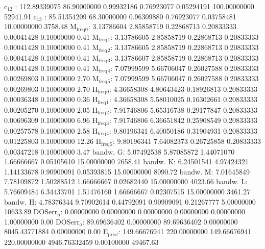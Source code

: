 \documentclass[11pt]{article}
\begin{document}
 c\(_{\text{12}}\)    : 112.89339075  86.90000000   0.99932186   0.76923077   0.05294191 100.00000000     52941.91
 c\(_{\text{13}}\)    :  85.51354209  68.30000000   0.96309880   0.76923077   0.03758481  10.00000000      3758.48
 M\(_{\text{freq}}\)\(_{\text{0}}\):   3.13786604   2.85858719   0.22868713   0.20833333   0.00041428   0.10000000         0.41
 M\(_{\text{freq}}\)\(_{\text{1}}\):   3.13786605   2.85858719   0.22868713   0.20833333   0.00041428   0.10000000         0.41
 M\(_{\text{freq}}\)\(_{\text{2}}\):   3.13786605   2.85858719   0.22868713   0.20833333   0.00041428   0.10000000         0.41
 M\(_{\text{freq}}\)\(_{\text{3}}\):   3.13786607   2.85858719   0.22868713   0.20833333   0.00041428   0.10000000         0.41
 M\(_{\text{freq}}\)\(_{\text{4}}\):   7.07999599   5.66706047   0.26027588   0.20833333   0.00269803   0.10000000         2.70
 M\(_{\text{freq}}\)\(_{\text{5}}\):   7.07999599   5.66706047   0.26027588   0.20833333   0.00269803   0.10000000         2.70
 H\(_{\text{freq}}\)\(_{\text{0}}\):   4.36658308   4.80643423   0.18926813   0.20833333   0.00036348   0.10000000         0.36
 H\(_{\text{freq}}\)\(_{\text{1}}\):   4.36658308   5.58010025   0.16302661   0.20833333   0.00205270   0.10000000         2.05
 H\(_{\text{freq}}\)\(_{\text{2}}\):   7.91746806   5.65316738   0.29177847   0.20833333   0.00696309   0.10000000         6.96
 H\(_{\text{freq}}\)\(_{\text{3}}\):   7.91746806   6.36651842   0.25908549   0.20833333   0.00257578   0.10000000         2.58
 H\(_{\text{freq}}\)\(_{\text{4}}\):   9.80196341   6.40050186   0.31904931   0.20833333   0.01225803   0.10000000        12.26
 H\(_{\text{freq}}\)\(_{\text{5}}\):   9.80196341   7.64082373   0.26725858   0.20833333   0.00347218   0.10000000         3.47
 bandw. G:   5.07492538   5.87085872   1.44071070   1.66666667   0.05105610  15.00000000      7658.41
 bandw. K:   6.24501541   4.97424321   1.14133678   0.90909091   0.05393815  15.00000000      8090.72
 bandw. M:   7.01645849   7.78109872   1.50288512   1.66666667   0.02682440  15.00000000      4023.66
 bandw. L:   5.76609484   6.34433701   1.51476160   1.66666667   0.02307515  15.00000000      3461.27
 bandw. H:   4.78376344   9.70902614   0.44792091   0.90909091   0.21267777   5.00000000     10633.89
 DOSerr\(_{\text{h}}\):   0.00000000   0.00000000   0.00000000   0.00000000   0.00000000   1.00000000         0.00
 DOSerr\(_{\text{o}}\):  89.69636402   0.00000000  89.69636402   0.00000000 8045.43771884   0.00000000         0.00
 E\(_{\text{pris}}\)\(_{\text{f}}\): 149.66676941 220.00000000 149.66676941 220.00000000 4946.76332459   0.00100000     49467.63
\end{document}
